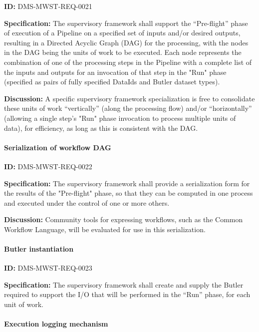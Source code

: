 \documentclass[SE,toc,lsstdraft]{lsstdoc}
\begin{document}
\label{DMS-MWST-REQ-0021}
\textbf{ID:} DMS-MWST-REQ-0021

\textbf{Specification:}
The supervisory framework shall support the “Pre-flight” phase of execution of a Pipeline on a specified set of inputs and/or desired outputs, resulting in a Directed Acyclic Graph (DAG) for the processing, with the nodes in the DAG being the units of work to be executed.  Each node represents the combination of one of the processing steps in the Pipeline with a complete list of the inputs and outputs for an invocation of that step in the "Run" phase (specified as pairs of fully specified DataIds and Butler dataset types).

\textbf{Discussion:}
A specific supervisory framework specialization is free to consolidate these units of work “vertically” (along the processing flow) and/or “horizontally” (allowing a single step's "Run" phase invocation to process multiple units of data), for efficiency, as long as this is consistent with the DAG.

\paragraph{Serialization of workflow DAG}\hfill  %

\label{DMS-MWST-REQ-0022}
\textbf{ID:} DMS-MWST-REQ-0022

\textbf{Specification:}
The supervisory framework shall provide a serialization form for the results of the "Pre-flight" phase, so that they can be computed in one process and executed under the control of one or more others.

\textbf{Discussion:}
Community tools for expressing workflows, such as the Common Workflow Language, will be evaluated for use in this serialization.

\paragraph{Butler instantiation}\hfill  %

\label{DMS-MWST-REQ-0023}
\textbf{ID:} DMS-MWST-REQ-0023

\textbf{Specification:}
The supervisory framework shall create and supply the Butler required to support the I/O that will be performed in the “Run” phase, for each unit of work.

\paragraph{Execution logging mechanism}\hfill  %
\end{document}
